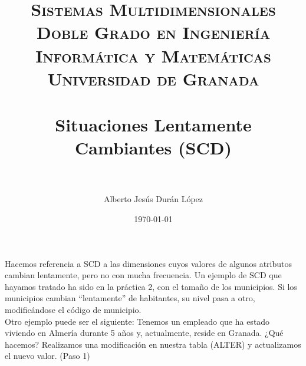 
\usepackage{listings}
\usepackage{dsfont}
\usepackage{booktabs}

\title{	
	\normalfont \normalsize 
	\textsc{\textbf{Sistemas Multidimensionales} \\ Doble Grado en Ingeniería Informática y Matemáticas \\ Universidad de Granada} \\ [25pt] %
	\horrule{0.5pt} \\[0.4cm] %
	\huge Situaciones Lentamente Cambiantes (SCD) \\ %
	\horrule{2pt} \\[0.5cm] %
}
\author{Alberto Jesús Durán López} %
\date{\normalsize\today} %



	
	\maketitle %
	
	\newpage %
	
	
	
	
	
	
	Hacemos referencia a SCD a las dimensiones cuyos valores de algunos atributos cambian lentamente, pero no con mucha frecuencia. Un ejemplo de SCD que hayamos tratado ha sido en la práctica 2, con el tamaño de los municipios.
	Si los municipios cambian “lentamente” de habitantes, su nivel pasa a otro, modificándose el código de municipio. \\
	
	
	
	
	Otro ejemplo puede ser el siguiente:  Tenemos un empleado que ha estado viviendo en Almería durante 5 años y, actualmente, reside en Granada. 
	¿Qué hacemos? Realizamos una modificación en nuestra tabla (ALTER) y actualizamos el nuevo valor. (Paso 1)
	
